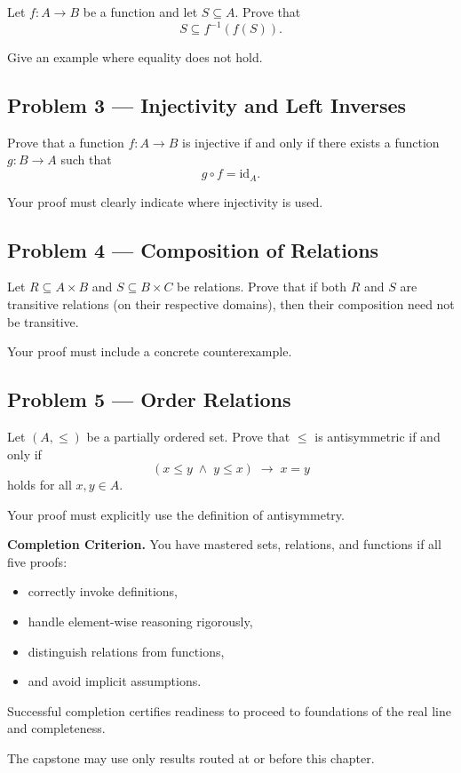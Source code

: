 Let $f : A \to B$ be a function and let $S \subseteq A$.
Prove that
\[
S \subseteq f^{-1}(f(S)).
\]

Give an example where equality does not hold.

\vspace{1.5em}

\subsection*{Problem 3 --- Injectivity and Left Inverses}

Prove that a function $f : A \to B$ is injective
if and only if there exists a function $g : B \to A$
such that
\[
g \circ f = \mathrm{id}_A.
\]

Your proof must clearly indicate where injectivity is used.

\vspace{1.5em}

\subsection*{Problem 4 --- Composition of Relations}

Let $R \subseteq A \times B$ and $S \subseteq B \times C$
be relations.
Prove that if both $R$ and $S$ are transitive relations
(on their respective domains), then their composition
need not be transitive.

Your proof must include a concrete counterexample.

\vspace{1.5em}

\subsection*{Problem 5 --- Order Relations}

Let $(A,\le)$ be a partially ordered set.
Prove that $\le$ is antisymmetric if and only if
\[
(x \le y \;\land\; y \le x) \;\rightarrow\; x = y
\]
holds for all $x,y \in A$.

Your proof must explicitly use the definition of antisymmetry.

\vspace{1em}

\noindent
\textbf{Completion Criterion.}
You have mastered sets, relations, and functions if all five proofs:
\begin{itemize}
  \item correctly invoke definitions,
  \item handle element-wise reasoning rigorously,
  \item distinguish relations from functions,
  \item and avoid implicit assumptions.
\end{itemize}

\noindent
Successful completion certifies readiness to proceed to
foundations of the real line and completeness.

\begin{remark*}
The capstone may use only results routed at or before this chapter.
\end{remark*}

\clearpage
